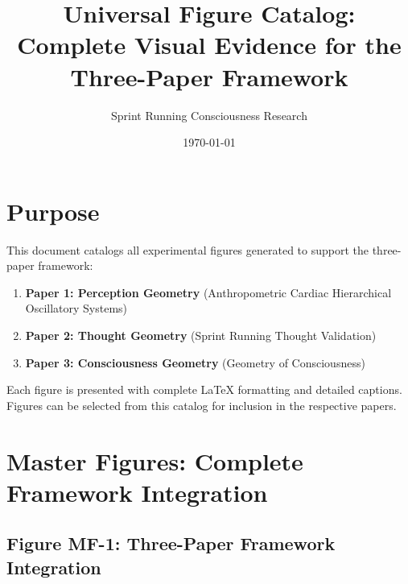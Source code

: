 \documentclass[11pt]{article}
\title{\textbf{Universal Figure Catalog:\\
Complete Visual Evidence for the Three-Paper Framework}}
\author{Sprint Running Consciousness Research}
\date{\today}
\begin{document}
\maketitle

\section*{Purpose}

This document catalogs all experimental figures generated to support the three-paper framework:
\begin{enumerate}
\item \textbf{Paper 1: Perception Geometry} (Anthropometric Cardiac Hierarchical Oscillatory Systems)
\item \textbf{Paper 2: Thought Geometry} (Sprint Running Thought Validation)
\item \textbf{Paper 3: Consciousness Geometry} (Geometry of Consciousness)
\end{enumerate}

Each figure is presented with complete LaTeX formatting and detailed captions. Figures can be selected from this catalog for inclusion in the respective papers.

\clearpage

\section{Master Figures: Complete Framework Integration}

\subsection{Figure MF-1: Three-Paper Framework Integration}
\end{document}
